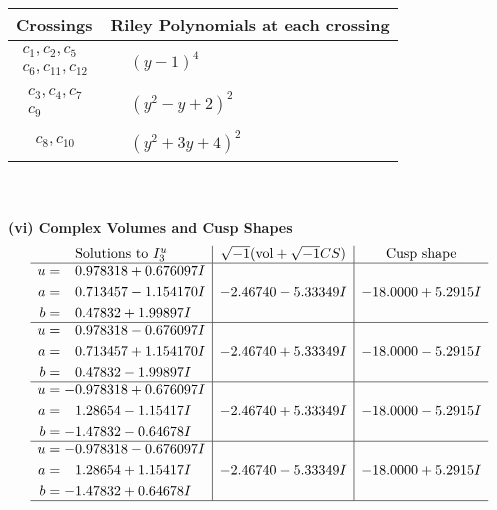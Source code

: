 \documentclass[1p]{elsarticle_modified}
\theoremstyle{definition}
\newcommand{\I}{\sqrt{-1}}
\begin{document}
\begin{tabular}{m{50pt}|m{274pt}}
Crossings & \hspace{64pt}Riley Polynomials at each crossing \\
\hline $$\begin{aligned}c_{1},c_{2},c_{5}\\c_{6},c_{11},c_{12}\end{aligned}$$&$\begin{aligned}
&(y-1)^4
\end{aligned}$\\
\hline $$\begin{aligned}c_{3},c_{4},c_{7}\\c_{9}\end{aligned}$$&$\begin{aligned}
&(y^2- y+2)^2
\end{aligned}$\\
\hline $$\begin{aligned}c_{8},c_{10}\end{aligned}$$&$\begin{aligned}
&(y^2+3 y+4)^2
\end{aligned}$\\
\hline
\end{tabular}\\~\\
\newpage\flushleft \textbf{(vi) Complex Volumes and Cusp Shapes}
$$\begin{array}{c|c|c}  
\text{Solutions to }I^u_{3}& \I (\text{vol} + \sqrt{-1}CS) & \text{Cusp shape}\\
 \hline 
\begin{aligned}
u &= \phantom{-}0.978318 + 0.676097 I \\
a &= \phantom{-}0.713457 - 1.154170 I \\
b &= \phantom{-}0.47832 + 1.99897 I\end{aligned}
 & -2.46740 - 5.33349 I & -18.0000 + 5.2915 I \\ \hline\begin{aligned}
u &= \phantom{-}0.978318 - 0.676097 I \\
a &= \phantom{-}0.713457 + 1.154170 I \\
b &= \phantom{-}0.47832 - 1.99897 I\end{aligned}
 & -2.46740 + 5.33349 I & -18.0000 - 5.2915 I \\ \hline\begin{aligned}
u &= -0.978318 + 0.676097 I \\
a &= \phantom{-}1.28654 - 1.15417 I \\
b &= -1.47832 - 0.64678 I\end{aligned}
 & -2.46740 + 5.33349 I & -18.0000 - 5.2915 I \\ \hline\begin{aligned}
u &= -0.978318 - 0.676097 I \\
a &= \phantom{-}1.28654 + 1.15417 I \\
b &= -1.47832 + 0.64678 I\end{aligned}
 & -2.46740 - 5.33349 I & -18.0000 + 5.2915 I\\
 \hline 
 \end{array}$$\newpage\newpage\renewcommand{\arraystretch}{1}
\end{document}
